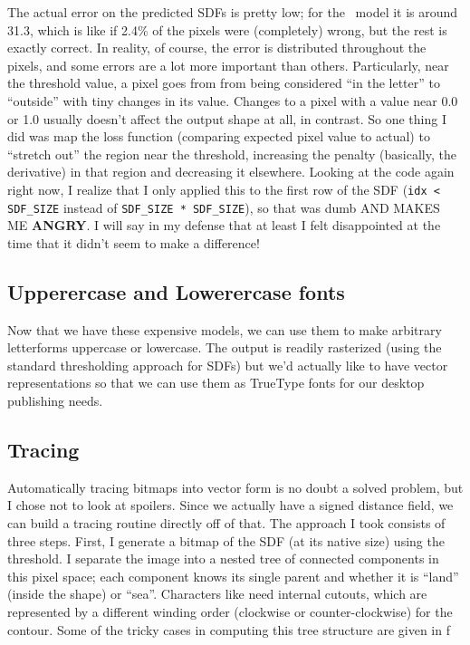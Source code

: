 \documentclass[twocolumn]{article} %
\begin{document}
The actual error on the predicted SDFs is pretty low; for the
\makelowercase\ model it is around 31.3, which is like if 2.4\% of the
pixels were (completely) wrong, but the rest is exactly correct. In
reality, of course, the error is distributed throughout the pixels,
and some errors are a lot more important than others. Particularly,
near the threshold value, a pixel goes from from being considered ``in
the letter'' to ``outside'' with tiny changes in its value. Changes to
a pixel with a value near 0.0 or 1.0 usually doesn't affect the output
shape at all, in contrast. So one thing I did was map the loss
function (comparing expected pixel value to actual) to ``stretch out''
the region near the threshold, increasing the penalty (basically, the
derivative) in that region and decreasing it elsewhere. Looking at the
code again right now, I realize that I only applied this to the first
row of the SDF (\verb+idx < SDF_SIZE+ instead of
\verb+SDF_SIZE * SDF_SIZE+), so that was dumb AND MAKES ME {\bf
  ANGRY}. I will say in my defense that at least I felt disappointed
at the time that it didn't seem to make a difference!


\subsection{Upperercase and Lowerercase fonts} \label{sec:fonts}

Now that we have these expensive models, we can use them to make
arbitrary letterforms uppercase or lowercase. The output is readily
rasterized (using the standard thresholding approach for SDFs) but
we'd actually like to have vector representations so that we can
use them as TrueType fonts for our desktop publishing needs.

\subsection{Tracing}
Automatically tracing bitmaps into vector form is no doubt a solved
problem, but I chose not to look at spoilers. Since we actually have a
signed distance field, we can build a tracing routine directly off of
that. The approach I took consists of three steps. First, I generate a
bitmap of the SDF (at its native size) using the threshold. I separate
the image into a nested tree of connected components in this pixel
space; each component knows its single parent and whether it is
``land'' (inside the shape) or ``sea''. Characters like 
need internal cutouts, which are represented by a different winding
order (clockwise or counter-clockwise) for the contour. Some of the
tricky cases in computing this tree structure are given in f
\end{document}
